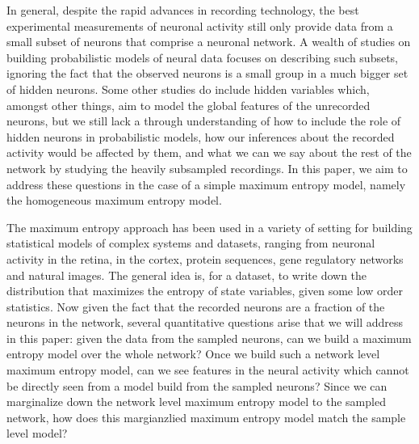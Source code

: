 \documentclass[\ifafour a4paper,12pt,\else a5paper,10pt,\fi%
onecolumn,oneside,article,%
british%
]{memoir}
\theoremstyle{remark}
\theoremstyle{innote}
\renewcommand*{\|}{\nonscript\,\vert\nonscript\;\mathopen{}}
\begin{document}
In general, despite the rapid advances in recording technology, the best
experimental measurements of neuronal activity still only provide data from
a small subset of neurons that comprise a neuronal network. A wealth of
studies on building probabilistic models of neural data focuses on
describing such subsets, ignoring the fact that the observed neurons is a
small group in a much bigger set of hidden neurons. Some other studies do
include hidden variables which, amongst other things, aim to model the
global features of the unrecorded neurons, but we still lack a through
understanding of how to include the role of hidden neurons in probabilistic
models, how our inferences about the recorded activity would be affected by
them, and what we can we say about the rest of the network by studying the
heavily subsampled recordings. In this paper, we aim to address these
questions in the case of a simple maximum entropy model, namely the
homogeneous maximum entropy model.

The maximum entropy approach has been used in a variety of setting for
building statistical models of complex systems and datasets, ranging from
neuronal activity in the retina, in the cortex, protein sequences, gene
regulatory networks and natural images. The general idea is, for a dataset,
to write down the distribution that maximizes the entropy of state
variables, given some low order statistics. Now given the fact that the
recorded neurons are a fraction of the neurons in the network, several
quantitative questions arise that we will address in this paper: given the
data from the sampled neurons, can we build a maximum entropy model over
the whole network? Once we build such a network level maximum entropy
model, can we see features in the neural activity which cannot be directly
seen from a model build from the sampled neurons? Since we can marginalize
down the network level maximum entropy model to the sampled network, how
does this margianzlied maximum entropy model match the sample level model?
\end{document}
